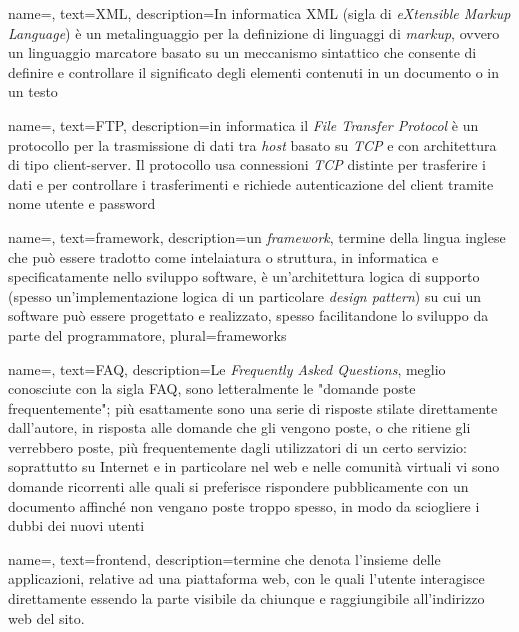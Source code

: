 {
    name=,
    text=XML,
    description={In informatica XML (sigla di \emph{eXtensible Markup Language}) è un metalinguaggio per la definizione di linguaggi di \emph{markup}, ovvero un linguaggio marcatore basato su un meccanismo sintattico che consente di definire e controllare il significato degli elementi contenuti in un documento o in un testo}
}

{
    name=,
    text=FTP,
    description={in informatica il \emph{File Transfer Protocol} è un protocollo per la trasmissione di dati tra \emph{host} basato su \emph{TCP} e con architettura di tipo client-server. Il protocollo usa connessioni \emph{TCP} distinte per trasferire i dati e per controllare i trasferimenti e richiede autenticazione del client tramite nome utente e password}
}

{
    name=,
    text=framework,
    description={un \emph{framework}, termine della lingua inglese che può essere tradotto come intelaiatura o struttura, in informatica e specificatamente nello sviluppo software, è un'architettura logica di supporto (spesso un'implementazione logica di un particolare \emph{design pattern}) su cui un software può essere progettato e realizzato, spesso facilitandone lo sviluppo da parte del programmatore},
    plural=frameworks
}

{
    name=,
    text=FAQ,
    description={Le \emph{Frequently Asked Questions}, meglio conosciute con la sigla FAQ, sono letteralmente le "domande poste frequentemente"; più esattamente sono una serie di risposte stilate direttamente dall'autore, in risposta alle domande che gli vengono poste, o che ritiene gli verrebbero poste, più frequentemente dagli utilizzatori di un certo servizio: soprattutto su Internet e in particolare nel web e nelle comunità virtuali vi sono domande ricorrenti alle quali si preferisce rispondere pubblicamente con un documento affinché non vengano poste troppo spesso, in modo da sciogliere i dubbi dei nuovi utenti}
}

{
    name=,
    text=frontend,
    description={termine che denota l’insieme delle applicazioni, relative ad una piattaforma
web, con le quali l’utente interagisce direttamente essendo la parte visibile da chiunque e raggiungibile all'indirizzo web del sito.}
}

